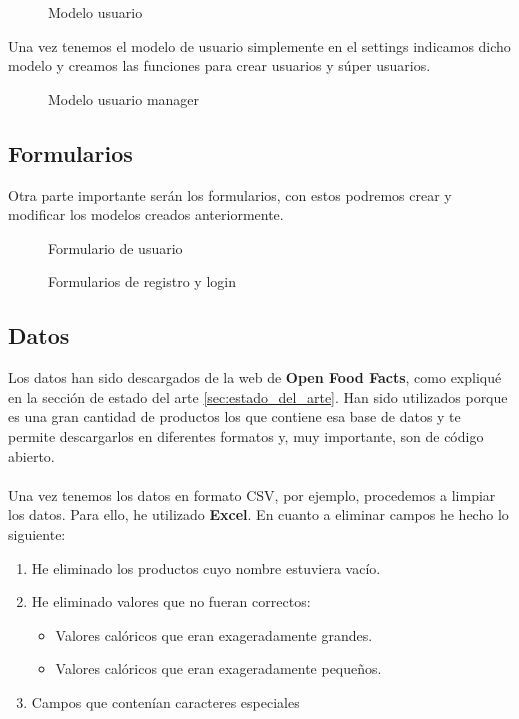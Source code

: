 \begin{figure}[H]
  \centering
  \noindent{}
  \caption{Modelo usuario}
\end{figure}

Una vez tenemos el modelo de usuario simplemente en el settings indicamos dicho modelo y creamos las funciones 
para crear usuarios y súper usuarios.\\

\begin{figure}[H]
  \centering
  \noindent{}
  \caption{Modelo usuario manager}
\end{figure}

\subsection{Formularios}

Otra parte importante serán los formularios, con estos podremos crear y modificar los modelos creados anteriormente.

\begin{figure}[H]
  \centering
  \noindent{}
  \caption{Formulario de usuario}
\end{figure}

\begin{figure}[H]
  \centering
  \noindent{}
  \caption{Formularios de registro y login}
\end{figure}

\subsection{Datos}

Los datos han sido descargados de la web de \textbf{Open Food Facts}, como expliqué en la sección de estado del arte \ref{sec:estado_del_arte}.
Han sido utilizados porque es una gran cantidad de productos los que contiene esa base de datos y te permite descargarlos en diferentes formatos y, muy importante,
son de código abierto.\\ \\

Una vez tenemos los datos en formato CSV, por ejemplo, procedemos a limpiar los datos. Para ello, he utilizado \textbf{Excel}. 
En cuanto a eliminar campos he hecho lo siguiente:
\begin{enumerate}
  \item He eliminado los productos cuyo nombre estuviera vacío.
  \item He eliminado valores que no fueran correctos:
  \begin{itemize}
    \item Valores calóricos que eran exageradamente grandes.
    \item Valores calóricos que eran exageradamente pequeños.
  \end{itemize}
  \item Campos que contenían caracteres especiales
\end{enumerate}


